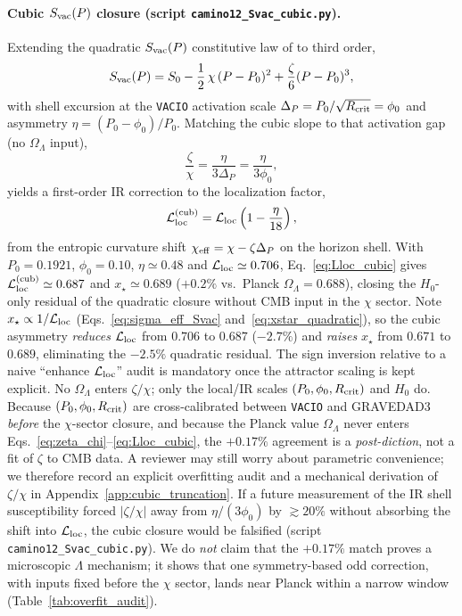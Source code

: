 \documentclass[prd,
               reprint,
               aps,
               preprintnumbers,
               nofootinbib,
               longbibliography,
               floatfix]{revtex4-2}
\begin{document}
\paragraph{Cubic $S_{\rm vac}(P)$ closure (script \texttt{camino12\_Svac\_cubic.py}).}
Extending the quadratic $S_{\rm vac}(P)$ constitutive law of
\cite{gravedad3zenodo} to third order,
\begin{equation}
\label{eq:Sv_cubic}
S_{\rm vac}(P)
=
S_0
-\frac12\,\chi\,(P-P_0)^2
+\frac{\zeta}{6}(P-P_0)^3,
\end{equation}
with shell excursion at the \texttt{VACIO} activation scale
$\Delta_P=P_0/\sqrt{R_{\rm crit}}=\phi_0$ and asymmetry
$\eta=(P_0-\phi_0)/P_0$.
Matching the cubic slope to that activation gap (no $\Omega_\Lambda$ input),
\begin{equation}
\label{eq:zeta_chi}
\frac{\zeta}{\chi}=\frac{\eta}{3\Delta_P}=\frac{\eta}{3\phi_0},
\end{equation}
yields a first-order IR correction to the localization factor,
\begin{equation}
\label{eq:Lloc_cubic}
\mathcal{L}_{\rm loc}^{\rm (cub)}
=
\mathcal{L}_{\rm loc}\left(1-\frac{\eta}{18}\right),
\end{equation}
from the entropic curvature shift
$\chi_{\rm eff}=\chi-\zeta\Delta_P$ on the horizon shell.
With $P_0=0.1921$, $\phi_0=0.10$, $\eta\simeq 0.48$ and
$\mathcal{L}_{\rm loc}\simeq 0.706$, Eq.~\eqref{eq:Lloc_cubic} gives
$\mathcal{L}_{\rm loc}^{\rm (cub)}\simeq 0.687$ and
$x_\star\simeq 0.689$ ($+0.2\%$ vs.\ Planck $\Omega_\Lambda=0.688$),
closing the $H_0$-only residual of the quadratic closure without CMB
input in the $\chi$ sector.
Note $x_\star\propto 1/\mathcal{L}_{\rm loc}$ (Eqs.~\eqref{eq:sigma_eff_Svac}
and~\eqref{eq:xstar_quadratic}), so the cubic asymmetry
\emph{reduces} $\mathcal{L}_{\rm loc}$ from $0.706$ to $0.687$ ($-2.7\%$)
and \emph{raises} $x_\star$ from $0.671$ to $0.689$, eliminating the
$-2.5\%$ quadratic residual.
The sign inversion relative to a naive ``enhance $\mathcal{L}_{\rm loc}$''
audit is mandatory once the attractor scaling is kept explicit.
No $\Omega_\Lambda$ enters $\zeta/\chi$; only the local/IR scales
$(P_0,\phi_0,R_{\rm crit})$ and $H_0$ do.
Because $(P_0,\phi_0,R_{\rm crit})$ are cross-calibrated between
\texttt{VACIO} and GRAVEDAD3 \emph{before} the $\chi$-sector closure,
and because the Planck value $\Omega_\Lambda$ never enters
Eqs.~\eqref{eq:zeta_chi}--\eqref{eq:Lloc_cubic}, the $+0.17\%$ agreement
is a \emph{post-diction}, not a fit of $\zeta$ to CMB data.
A reviewer may still worry about parametric convenience; we therefore
record an explicit overfitting audit and a mechanical derivation of
$\zeta/\chi$ in Appendix~\ref{app:cubic_truncation}.
If a future measurement of the IR shell susceptibility forced
$|\zeta/\chi|$ away from $\eta/(3\phi_0)$ by $\gtrsim 20\%$ without
absorbing the shift into $\mathcal{L}_{\rm loc}$, the cubic closure
would be falsified (script \texttt{camino12\_Svac\_cubic.py}).
We do \emph{not} claim that the $+0.17\%$ match proves a microscopic
$\Lambda$ mechanism; it shows that one symmetry-based odd correction,
with inputs fixed before the $\chi$ sector, lands near Planck within a
narrow window (Table~\ref{tab:overfit_audit}).
\end{document}

